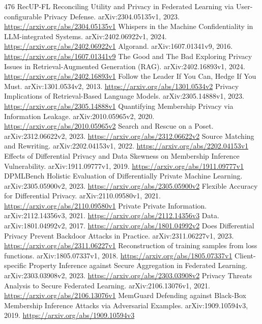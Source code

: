 \documentclass[11pt]{article}
\begin{document}
\begin{thebibliography}{476}
 RecUP-FL Reconciling Utility and Privacy in Federated Learning via User-configurable Privacy Defense. arXiv:2304.05135v1, 2023. \url{https://arxiv.org/abs/2304.05135v1}
 Whispers in the Machine Confidentiality in LLM-integrated Systems. arXiv:2402.06922v1, 2024. \url{https://arxiv.org/abs/2402.06922v1}
 Algorand. arXiv:1607.01341v9, 2016. \url{https://arxiv.org/abs/1607.01341v9}
 The Good and The Bad Exploring Privacy Issues in Retrieval-Augmented Generation (RAG). arXiv:2402.16893v1, 2024. \url{https://arxiv.org/abs/2402.16893v1}
 Follow the Leader If You Can, Hedge If You Must. arXiv:1301.0534v2, 2013. \url{https://arxiv.org/abs/1301.0534v2}
 Privacy Implications of Retrieval-Based Language Models. arXiv:2305.14888v1, 2023. \url{https://arxiv.org/abs/2305.14888v1}
 Quantifying Membership Privacy via Information Leakage. arXiv:2010.05965v2, 2020. \url{https://arxiv.org/abs/2010.05965v2}
 Search and Rescue on a Poset. arXiv:2312.06622v2, 2023. \url{https://arxiv.org/abs/2312.06622v2}
 Source Matching and Rewriting. arXiv:2202.04153v1, 2022. \url{https://arxiv.org/abs/2202.04153v1}
 Effects of Differential Privacy and Data Skewness on Membership Inference Vulnerability. arXiv:1911.09777v1, 2019. \url{https://arxiv.org/abs/1911.09777v1}
 DPMLBench Holistic Evaluation of Differentially Private Machine Learning. arXiv:2305.05900v2, 2023. \url{https://arxiv.org/abs/2305.05900v2}
 Flexible Accuracy for Differential Privacy. arXiv:2110.09580v1, 2021. \url{https://arxiv.org/abs/2110.09580v1}
 Private Private Information. arXiv:2112.14356v3, 2021. \url{https://arxiv.org/abs/2112.14356v3}
 Data. arXiv:1801.04992v2, 2017. \url{https://arxiv.org/abs/1801.04992v2}
 Does Differential Privacy Prevent Backdoor Attacks in Practice. arXiv:2311.06227v1, 2023. \url{https://arxiv.org/abs/2311.06227v1}
 Reconstruction of training samples from loss functions. arXiv:1805.07337v1, 2018. \url{https://arxiv.org/abs/1805.07337v1}
 Client-specific Property Inference against Secure Aggregation in Federated Learning. arXiv:2303.03908v2, 2023. \url{https://arxiv.org/abs/2303.03908v2}
 Privacy Threats Analysis to Secure Federated Learning. arXiv:2106.13076v1, 2021. \url{https://arxiv.org/abs/2106.13076v1}
 MemGuard Defending against Black-Box Membership Inference Attacks via Adversarial Examples. arXiv:1909.10594v3, 2019. \url{https://arxiv.org/abs/1909.10594v3}

\end{thebibliography}
\end{document}
